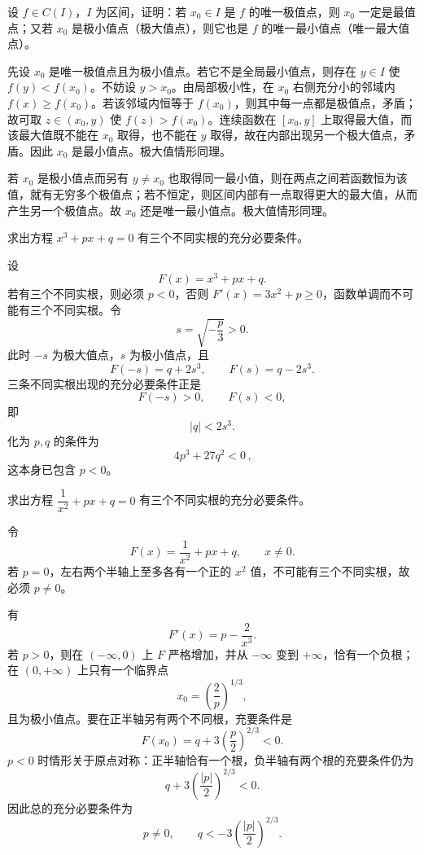 \begin{xexercise}[1]
设 $f\in C(I)$，$I$ 为区间，证明：若 $x_0\in I$ 是 $f$ 的唯一极值点，则 $x_0$ 一定是最值点；又若 $x_0$ 是极小值点（极大值点），则它也是 $f$ 的唯一最小值点（唯一最大值点）。
\end{xexercise}
\begin{xsolution}
先设 $x_0$ 是唯一极值点且为极小值点。若它不是全局最小值点，则存在 $y\in I$ 使 $f(y)<f(x_0)$。不妨设 $y>x_0$。由局部极小性，在 $x_0$ 右侧充分小的邻域内 $f(x)\ge f(x_0)$。若该邻域内恒等于 $f(x_0)$，则其中每一点都是极值点，矛盾；故可取 $z\in(x_0,y)$ 使 $f(z)>f(x_0)$。连续函数在 $[x_0,y]$ 上取得最大值，而该最大值既不能在 $x_0$ 取得，也不能在 $y$ 取得，故在内部出现另一个极大值点，矛盾。因此 $x_0$ 是最小值点。极大值情形同理。

若 $x_0$ 是极小值点而另有 $y\ne x_0$ 也取得同一最小值，则在两点之间若函数恒为该值，就有无穷多个极值点；若不恒定，则区间内部有一点取得更大的最大值，从而产生另一个极值点。故 $x_0$ 还是唯一最小值点。极大值情形同理。
\end{xsolution}


\begin{xexercise}[2]
求出方程 $x^3+px+q=0$ 有三个不同实根的充分必要条件。
\end{xexercise}
\begin{xsolution}
设
\[
  F(x)=x^3+px+q.
\]
若有三个不同实根，则必须 $p<0$，否则 $F'(x)=3x^2+p\ge0$，函数单调而不可能有三个不同实根。令
\[
  s=\sqrt{-\frac p3}>0.
\]
此时 $-s$ 为极大值点，$s$ 为极小值点，且
\[
  F(-s)=q+2s^3,\qquad F(s)=q-2s^3.
\]
三条不同实根出现的充分必要条件正是
\[
  F(-s)>0,\qquad F(s)<0,
\]
即
\[
  |q|<2s^3.
\]
化为 $p,q$ 的条件为
\[
  \boxed{\,4p^3+27q^2<0\,},
\]
这本身已包含 $p<0$。
\end{xsolution}


\begin{xexercise}[3]
求出方程 $\dfrac1{x^2}+px+q=0$ 有三个不同实根的充分必要条件。
\end{xexercise}
\begin{xsolution}
令
\[
  F(x)=\frac1{x^2}+px+q,\qquad x\ne0.
\]
若 $p=0$，左右两个半轴上至多各有一个正的 $x^2$ 值，不可能有三个不同实根，故必须 $p\ne0$。

有
\[
  F'(x)=p-\frac2{x^3}.
\]
若 $p>0$，则在 $(-\infty,0)$ 上 $F$ 严格增加，并从 $-\infty$ 变到 $+\infty$，恰有一个负根；在 $(0,+\infty)$ 上只有一个临界点
\[
  x_0=\left(\frac2p\right)^{1/3},
\]
且为极小值点。要在正半轴另有两个不同根，充要条件是
\[
  F(x_0)=q+3\left(\frac p2\right)^{2/3}<0.
\]
$p<0$ 时情形关于原点对称：正半轴恰有一个根，负半轴有两个根的充要条件仍为
\[
  q+3\left(\frac{|p|}{2}\right)^{2/3}<0.
\]
因此总的充分必要条件为
\[
  \boxed{p\ne0,\qquad q<-3\left(\frac{|p|}{2}\right)^{2/3}}.
\]
\end{xsolution}


